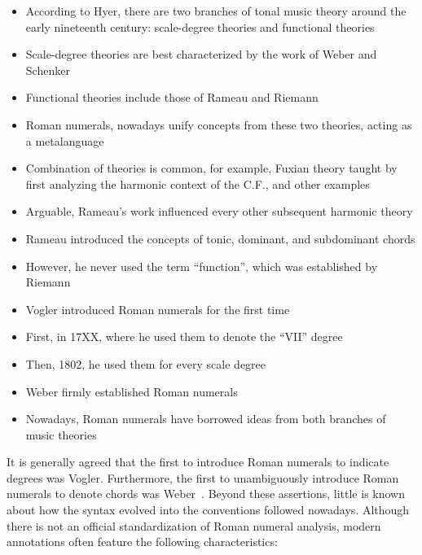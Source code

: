 \begin{itemize}
    \item According to Hyer, there are two branches of tonal music theory around the early nineteenth century: scale-degree theories and functional theories
    \item Scale-degree theories are best characterized by the work of Weber and Schenker
    \item Functional theories include those of Rameau and Riemann
    \item Roman numerals, nowadays unify concepts from these two theories, acting as a metalanguage
    \item Combination of theories is common, for example, Fuxian theory taught by first analyzing the harmonic context of the C.F., and other examples
    \item Arguable, Rameau's work influenced every other subsequent harmonic theory
    \item Rameau introduced the concepts of tonic, dominant, and subdominant chords
    \item However, he never used the term ``function'', which was established by Riemann
    \item Vogler introduced Roman numerals for the first time
    \item First, in 17XX, where he used them to denote the ``VII'' degree
    \item Then, 1802, he used them for every scale degree
    \item Weber firmly established Roman numerals
    \item Nowadays, Roman numerals have borrowed ideas from both branches of music theories
\end{itemize}



It is generally agreed that the first to introduce Roman numerals to indicate degrees was Vogler.
Furthermore, the first to unambiguously introduce Roman numerals to denote chords was Weber~\parencite{weber_theory_2018}.
Beyond these assertions, little is known about how the syntax evolved into the conventions followed nowadays.
Although there is not an official standardization of Roman numeral analysis, modern annotations often feature the following characteristics:



